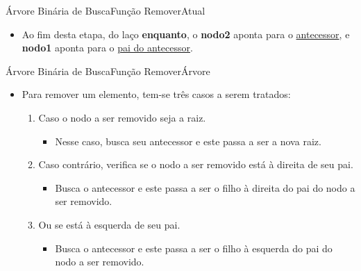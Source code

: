 \documentclass[aspectratio=169]{beamer}
\begin{document}
\begin{frame}{Árvore Binária de Busca}{Função RemoverAtual}
\begin{itemize}
 \item Ao fim desta etapa, do laço {\bf enquanto}, o {\bf nodo2} aponta para o \underline{antecessor}, e {\bf nodo1} aponta para o \underline{pai do antecessor}.
\end{itemize}
\end{frame}


\begin{frame}{Árvore Binária de Busca}{Função RemoverÁrvore}
\begin{itemize}
 \item Para remover um elemento, tem-se três casos a serem tratados:
 \begin{enumerate}
 \item Caso o nodo a ser removido seja a raiz.
 \begin{itemize}
 \item Nesse caso, busca seu antecessor e este passa a ser a nova raiz.
 \end{itemize}
 \item Caso contrário, verifica se o nodo a ser removido está à direita de seu pai.
 \begin{itemize}
 \item Busca o antecessor e este passa a ser o filho à direita do pai do nodo a ser removido.
 \end{itemize}
 \item Ou se está à esquerda de seu pai.
 \begin{itemize}
 \item Busca o antecessor e este passa a ser o filho à esquerda do pai do nodo a ser removido.
 \end{itemize} 
 \end{enumerate}
\end{itemize}
\end{frame}

\end{document}
